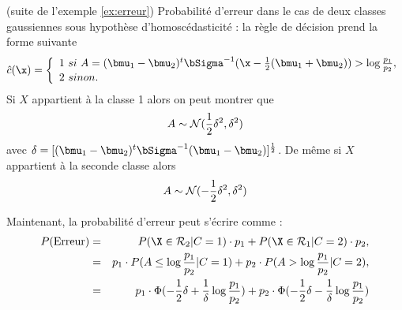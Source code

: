 \begin{ex}\cite{Ripley1996}(suite de l'exemple \ref{ex:erreur})
Probabilit\'e d'erreur dans le cas de deux classes gaussiennes sous hypoth\`ese d'homosc\'edasticit\'e :
la r\`egle de d\'ecision prend la forme suivante
$$
\hat{c}(\x)=
\left \{ \begin{array}{l}
1 \ si \ A=(\bmu_1 - \bmu_2)^t \bSigma^{-1}(\x - \frac{1}{2}(\bmu_1 + \bmu_2)) > \log \frac{p_1}{p_2} , \\
2 \ sinon.\\
\end{array}
\right .
$$
Si $X$ appartient \`a la classe 1 alors on peut montrer que
$$
A \sim {\cal N}(\frac{1}{2}\delta^2,\delta^2)
$$
avec $\delta=[(\bmu_1 - \bmu_2)^t \bSigma^{-1} (\bmu_1 - \bmu_2)]^{\frac{1}{2}}$.
De m\^eme si $X$ appartient \`a la seconde classe alors 
$$
A \sim {\cal N}(-\frac{1}{2}\delta^2,\delta^2)
$$

Maintenant,  la probabilit\'e d'erreur peut s'\'ecrire comme : 
\begin{eqnarray*}
P(\mbox{Erreur})& = &  P(\X \in {\cal R}_2 | C=1) \cdot p_1 +  
			    P(\X \in {\cal R}_1 | C=2) \cdot p_2,\\
		& = &  p_1 \cdot P(A\leq \log \frac{p_1}{p_2}| C=1) + p_2 \cdot  P(A > \log \frac{p_1}{p_2}| C=2),\\
                & = &  p_1 \cdot \Phi(-\frac{1}{2} \delta + \frac{1}{\delta} \log \frac{p_1}{p_2}) + p_2 \cdot \Phi(-\frac{1}{2} \delta - \frac{1}{\delta} \log \frac{p_1}{p_2})
\end{eqnarray*}


\end{ex}

